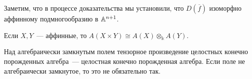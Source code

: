 	    Заметим, что в процессе доказательства мы установили, что $D(\overline{f})$ изоморфно аффинному подмногообразию в $\AA^{n + 1}$.

    	\begin{exercise}
			Если $X, Y$~--- аффинные, то $A(X \times Y) \cong A(X) \otimes_{\Bbbk} A(Y)$.    
    	\end{exercise}
    	\begin{remark}
    		Над алгебраически замкнутым полем тензорное произведение целостных конечно порожденных алгебра~--- целостная конечно порожденная алгебра. Если поле не алгебраически замкнутое, то это не обязательно так. 
    	\end{remark}

    	





